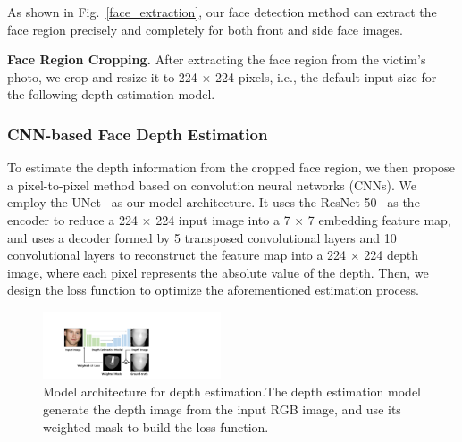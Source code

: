 As shown in Fig.~\ref{face_extraction},  our face detection method can extract the face region precisely and completely for both front and side face images.

\textbf{Face Region Cropping.} 
After extracting the face region from the victim's photo, we crop and resize it to 224 $\times$ 224 pixels, i.e., the default input size for the following depth estimation model.

\subsubsection{CNN-based Face Depth Estimation}
To estimate the depth information from the cropped face region, we then propose a pixel-to-pixel method based on convolution neural networks (CNNs). We employ the UNet~\cite{ronneberger2015u} as our model architecture. It uses the  ResNet-50~\cite{he2016deep} as the encoder to reduce a 224 $\times$ 224 input image into a 7 $\times$ 7 embedding feature map, and uses a decoder formed by 5 transposed convolutional layers and 10 convolutional layers to reconstruct the feature map into a 224 $\times$ 224 depth image, where each pixel represents the absolute value of the depth.  Then, we design the loss function to optimize the aforementioned estimation process.


\begin{figure}[!t]
	\centering
	\includegraphics[width=0.47\textwidth]{figures/model_architecture_1.pdf} 
	\vspace{-0.15in}
	\caption{Model architecture for depth estimation.The depth estimation model generate the depth image from the input RGB image, and use its weighted mask to build the loss function.}
	\label{model_architecture}
	\vspace{-0.15in}
\end{figure}

